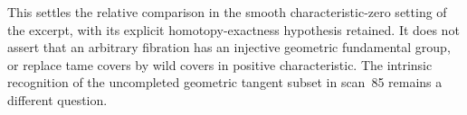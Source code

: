 This settles the relative comparison in the smooth
characteristic-zero setting of the excerpt, with its explicit
homotopy-exactness hypothesis retained. It does not assert that an
arbitrary fibration has an injective geometric fundamental group,
or replace tame covers by wild covers in positive characteristic.
The intrinsic recognition of the uncompleted geometric tangent
subset in scan~85 remains a different question.
